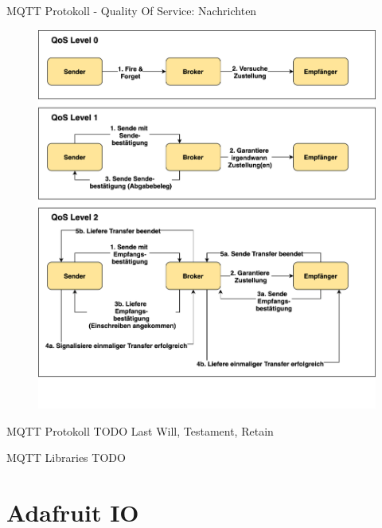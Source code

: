 \begin{frame}{MQTT Protokoll - Quality Of Service: Nachrichten}
   \vspace*{-1.5mm}
   \begin{figure}[!htb]
       \hspace*{5mm}
        \includegraphics[scale=0.14]{7-datenaustausch/img/mqtt-qos} 
    \end{figure}
\end{frame}

\begin{frame}{MQTT Protokoll}
    TODO 
   Last Will, Testament, Retain
\end{frame}


\begin{frame}{MQTT Libraries}
    TODO
\end{frame}


\section{Adafruit IO}

